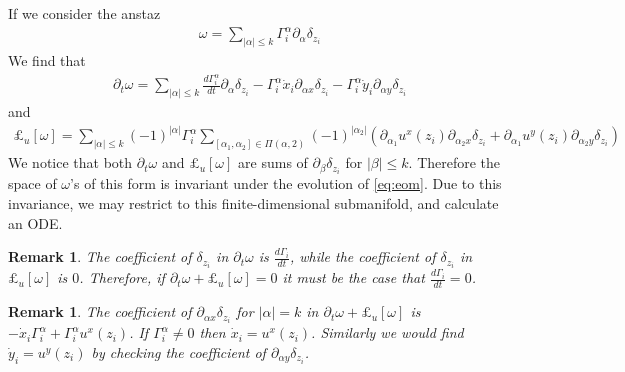 \documentclass[12pt]{amsart}
\newtheorem{rmk}[thm]{Remark}
\begin{document}
If we consider the anstaz
\begin{align*}
  \omega = \sum_{|\alpha| \leq k} \Gamma_i^\alpha \partial_\alpha \delta_{z_i}
\end{align*}
We find that
\begin{align*}
  \partial_t \omega = \sum_{|\alpha| \leq k} \frac{d\Gamma_i^\alpha}{dt} \partial_{\alpha}\delta_{z_i} - \Gamma_i^{\alpha}\dot{x}_i \partial_{\alpha x}\delta_{z_i} 
  - \Gamma_i^{\alpha} \dot{y}_i \partial_{\alpha y} \delta_{z_i}
\end{align*}
and
\begin{align*}
  \pounds_u[\omega] = \sum_{|\alpha|\leq k}(-1)^{|\alpha|} \Gamma_i^\alpha  
  \sum_{ [\alpha_1,\alpha_2] \in \Pi(\alpha,2)}
  (-1)^{|\alpha_2|} \left(
  \partial_{\alpha_1}u^x(z_i) \partial_{\alpha_2 x} \delta_{z_i} +
  \partial_{\alpha_1}u^y(z_i) \partial_{\alpha_2 y} \delta_{z_i}
  \right)
\end{align*}
We notice that both $\partial_t \omega$ and $\pounds_u [\omega]$
are sums of $\partial_{\beta} \delta_{z_i}$ for $|\beta| \leq k$.
Therefore the space of $\omega$'s of this form is invariant under
the evolution of \eqref{eq:eom}.
Due to this invariance, we may restrict to this finite-dimensional submanifold, and calculate an ODE.

\begin{rmk}
  The coefficient of  $\delta_{z_i}$
  in $\partial_t \omega$ is $\frac{d\Gamma_i}{dt}$,
  while the coefficient of $\delta_{z_i}$ in $\pounds_u[\omega]$ is $0$.
  Therefore, if $\partial_t \omega + \pounds_{u}[\omega] = 0$
  it must be the case that $\frac{d\Gamma_i}{dt} = 0$.
\end{rmk}
\begin{rmk}
  The coefficient of $\partial_{\alpha x} \delta_{z_i}$ for $|\alpha|=k$
  in $\partial_t \omega + \pounds_u[\omega]$ is
  $- \dot{x}_i \Gamma_i^\alpha + \Gamma_i^\alpha u^x(z_i)$.
  If $\Gamma_i^\alpha \neq 0$ then $\dot{x}_i = u^x(z_i)$.
  Similarly we would find $\dot{y}_i = u^y(z_i)$ by checking the coefficient of $\partial_{\alpha y} \delta_{z_i}$.
\end{rmk}
\end{document}
